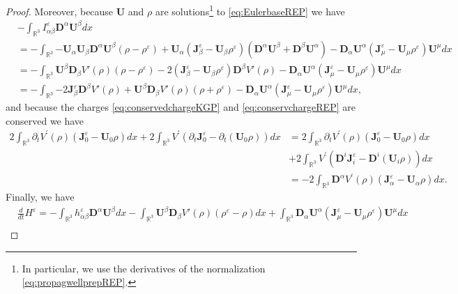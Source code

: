 \documentclass[a4paper, 15pt]{article}
\numberwithin{equation}{section}
\begin{document}
\begin{proof}
Moreover, because $\textbf{U}$ and $\rho$ are solutions\footnote{In particular, we use the derivatives of the normalization \eqref{eq:propagwellprepREP}.} to \eqref{eq:EulerbaseREP} we have 
\begin{align*}
    &-\int_{\mathbb{R}^3}{I^\varepsilon_{\alpha\beta}\textbf{D}^\alpha \textbf{U}^\beta dx}\\
    &=-\int_{\mathbb{R}^3}{-\textbf{U}_\alpha \textbf{U}_\beta\textbf{D}^\alpha \textbf{U}^\beta(\rho-\rho^\varepsilon)+\textbf{U}_\alpha (\textbf{J}^\varepsilon_\beta-\textbf{U}_\beta\rho^\varepsilon)(\textbf{D}^\alpha \textbf{U}^\beta+\textbf{D}^\beta \textbf{U}^\alpha)-\textbf{D}_\alpha \textbf{U}^\alpha(\textbf{J}^\varepsilon_\mu-\textbf{U}_\mu \rho^\varepsilon)\textbf{U}^\mu dx}\\
    &=-\int_{\mathbb{R}^3}{\textbf{U}^\beta \textbf{D}_\beta V'(\rho)(\rho-\rho^\varepsilon)-2(\textbf{J}^\varepsilon_\beta-\textbf{U}_\beta\rho^\varepsilon)\textbf{D}^\beta V'(\rho)-\textbf{D}_\alpha \textbf{U}^\alpha(\textbf{J}^\varepsilon_\mu-\textbf{U}_\mu \rho^\varepsilon)\textbf{U}^\mu dx}\\
    &=-\int_{\mathbb{R}^3}{-2\textbf{J}^\varepsilon_\beta \textbf{D}^\beta V'(\rho)+\textbf{U}^\beta \textbf{D}_\beta V'(\rho)(\rho+\rho^\varepsilon)-\textbf{D}_\alpha \textbf{U}^\alpha(\textbf{J}^\varepsilon_\mu-\textbf{U}_\mu \rho^\varepsilon)\textbf{U}^\mu dx},
\end{align*}
and because the charges \eqref{eq:conservedchargeKGP} and \eqref{eq:conservchargeREP} are conserved we have
\begin{align*}
    2\int_{\mathbb{R}^3}{\partial_tV^{\prime}(\rho)(\textbf{J}^\varepsilon_0-\textbf{U}_0\rho) dx}
+2\int_{\mathbb{R}^3}{ V^{\prime}(\partial_t\textbf{J}^\varepsilon_0-\partial_t(\textbf{U}_0\rho)) dx}&=2\int_{\mathbb{R}^3}{\partial_tV^{\prime}(\rho)(\textbf{J}^\varepsilon_0-\textbf{U}_0\rho) dx}\\
&+2\int_{\mathbb{R}^3}{ V^{\prime}(\textbf{D}^i \textbf{J}^\varepsilon_i-\textbf{D}^i(\textbf{U}_i\rho)) dx}\\
&=-2\int_{\mathbb{R}^3}{\textbf{D}^\alpha V^{\prime}(\rho)(\textbf{J}^\varepsilon_\alpha-\textbf{U}_\alpha\rho) dx}.
\end{align*}
Finally, we have
\begin{align*}
		&\frac{d}{dt}H^\varepsilon=-\int_{\mathbb{R}^3}{h^\varepsilon_{\alpha\beta}\textbf{D}^\alpha \textbf{U}^\beta dx}-\int_{\mathbb{R}^3}{\textbf{U}^\beta \textbf{D}_\beta V'(\rho)(\rho^\varepsilon-\rho)dx}+\int_{\mathbb{R}^3}{\textbf{D}_\alpha \textbf{U}^\alpha(\textbf{J}^\varepsilon_\mu-\textbf{U}_\mu \rho^\varepsilon)\textbf{U}^\mu dx}\\

\end{align*}
\end{proof}
\end{document}
